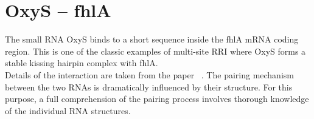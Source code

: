 \documentclass[twoside,a4paper]{report}
\numberwithin{equation}{section}
\begin{document}
%
%			

	
	\section{OxyS – fhlA}
	
	The small RNA OxyS binds to a short sequence inside the fhlA mRNA coding region. This is one of the classic examples of multi-site RRI where OxyS forms a stable kissing hairpin complex with fhlA. \\
	Details of the interaction are taken from the paper ~\citep{argaman2000fhla}. The pairing mechanism between the two RNAs is dramatically influenced by their structure. For this purpose, a full comprehension of the pairing process involves thorough knowledge of the individual RNA structures. \\
	
\end{document}
